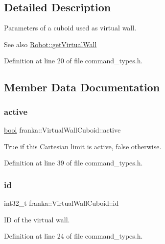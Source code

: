 \subsection{Detailed Description}
Parameters of a cuboid used as virtual wall.

\begin{DoxySeeAlso}{See also}
\hyperlink{classfranka_1_1Robot_a1739f6dc13f0c33b3213375323c93399}{Robot\+::get\+Virtual\+Wall} 
\end{DoxySeeAlso}


Definition at line 20 of file command\+\_\+types.\+h.



\subsection{Member Data Documentation}
\mbox{\label{structfranka_1_1VirtualWallCuboid_a69a20329da226fe49702b7d725670042}} 
\subsubsection{\texorpdfstring{active}{active}}
{\footnotesize\ttfamily \hyperlink{classbool}{bool} franka\+::\+Virtual\+Wall\+Cuboid\+::active}

True if this Cartesian limit is active, false otherwise. 

Definition at line 39 of file command\+\_\+types.\+h.

\mbox{\label{structfranka_1_1VirtualWallCuboid_a2cee9b57fa420372a9576899875ad71a}} 
\subsubsection{\texorpdfstring{id}{id}}
{\footnotesize\ttfamily int32\+\_\+t franka\+::\+Virtual\+Wall\+Cuboid\+::id}

ID of the virtual wall. 

Definition at line 24 of file command\+\_\+types.\+h.

\mbox{\label{structfranka_1_1VirtualWallCuboid_a754b771744e0df1facecd31835a78790}} 
